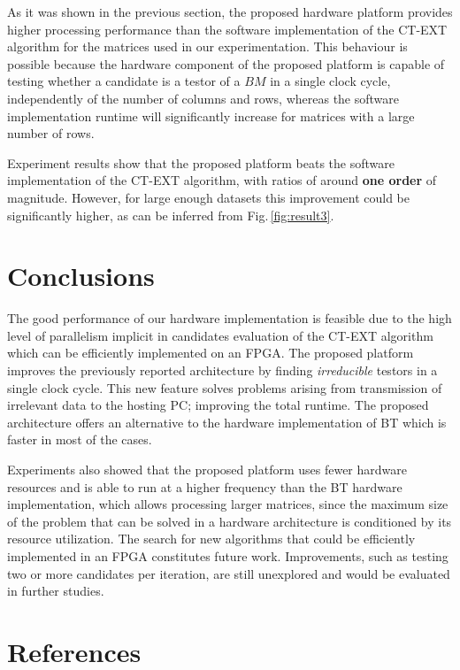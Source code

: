 \documentclass[authoryear,preprint,review,12pt]{elsarticle}
\begin{document}
As it was shown in the previous section, the proposed hardware platform provides higher processing
performance than the software implementation of the CT-EXT
algorithm for the matrices used in our experimentation. 
This behaviour is possible because the hardware
component of the proposed platform is capable of testing whether a 
candidate is a testor of a $BM$ in a single clock cycle,
independently of the number of columns and rows, whereas
the software implementation runtime will significantly
increase for matrices with a large number of rows.

Experiment results show that the proposed platform beats the software implementation of
the CT-EXT algorithm, with ratios of around \textbf{one order} of magnitude. However, for large 
enough datasets this improvement could be significantly higher, as can be inferred from 
Fig.\,\ref{fig:result3}.

\section{Conclusions}
\label{sect:8}

The good performance of our hardware implementation is feasible due to the
high level of parallelism implicit in candidates evaluation of the CT-EXT algorithm which can be
efficiently implemented on an FPGA. 
The proposed platform improves the previously reported architecture \citep{R21} by finding 
\textit{irreducible} testors in a single clock cycle. This new feature solves problems arising 
from transmission of irrelevant data to the hosting PC; improving the total runtime. The proposed architecture offers an alternative to the hardware implementation of BT which is faster in most 
of the cases. 

Experiments also showed that the proposed platform uses fewer hardware resources and is able to run at a higher 
frequency than the BT hardware implementation, which allows processing larger matrices, since the maximum size of 
the problem that can be solved in a hardware architecture is conditioned by its resource utilization. The search for new algorithms that could be efficiently implemented in an FPGA constitutes future work. Improvements, such 
as testing two or more candidates per iteration, are still unexplored and would be evaluated in further studies.



\section*{References}

\end{document}
